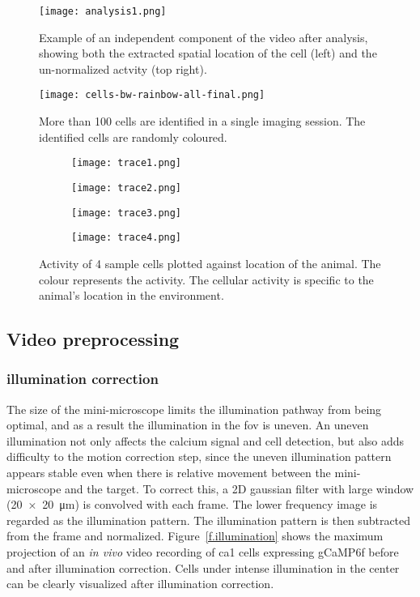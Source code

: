 \begin{figure}[h]
    \texttt{[image: analysis1.png]}
    \caption{Example of an independent component of the video after analysis, showing both the extracted spatial location of the cell (left) and the un-normalized actvity (top right). \label{f.analysis}}
\end{figure}


\begin{figure}[h]
    \texttt{[image: cells-bw-rainbow-all-final.png]}
    \caption{More than 100 cells are identified in a single imaging session. The identified cells are randomly coloured. \label{f.ca1rainbow}}
\end{figure}


\begin{figure}[h]
    \begin{subfigure}[t]{.5\linewidth}
        \texttt{[image: trace1.png]}
    \end{subfigure}
    \begin{subfigure}[t]{.5\linewidth}
        \texttt{[image: trace2.png]}
    \end{subfigure}
    \begin{subfigure}[t]{.5\linewidth}
        \texttt{[image: trace3.png]}
    \end{subfigure}
    \begin{subfigure}[t]{.5\linewidth}
        \texttt{[image: trace4.png]}
    \end{subfigure}
    \caption{Activity of 4 sample cells plotted against location of the animal. The colour represents the  activity. The cellular activity is specific to the animal's location in the environment. \label{f.traceplot}}
\end{figure}

\subsection{Video preprocessing}
\subsubsection{illumination correction}
The size of the mini-microscope limits the illumination pathway from being optimal, and as a result the illumination in the \gls{fov} is uneven. An uneven illumination not only affects the calcium signal and cell detection, but also adds difficulty to the motion correction step, since the uneven illumination pattern appears stable even when there is relative movement between the mini-microscope and the target. To correct this, a 2D gaussian filter with large window (\SI{20x20}{\um}) is convolved with each frame. The lower frequency image is regarded as the illumination pattern. The illumination pattern is then subtracted from the frame and normalized. Figure~\ref{f.illumination} shows the maximum projection of an \textit{in vivo} video recording of \gls{ca1} cells expressing gCaMP6f before and after illumination correction. Cells under intense illumination in the center can be clearly visualized after illumination correction.

